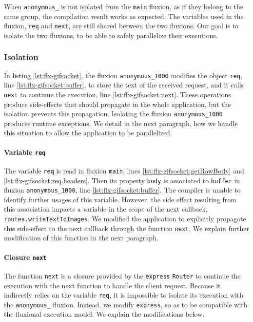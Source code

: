 When \texttt{anonymous\_} is not isolated from the \texttt{main} fluxion, as if they belong to the same group, the compilation result works as expected.
The variables used in the fluxion, \texttt{req} and \texttt{next}, are still shared between the two fluxions.
Our goal is to isolate the two fluxions, to be able to safely parallelize their executions.

\subsubsection{Isolation}

In listing \ref{lst:flx-gifsocket}, the fluxion \texttt{anonymous\_1000} modifies the object \texttt{req}, line \ref{lst:flx-gifsocket:buffer}, to store the text of the received request, and it calls \texttt{next} to continue the execution, line \ref{lst:flx-gifsocket:next}.
These operations produce side-effects that should propagate in the whole application, but the isolation prevents this propagation.
Isolating the fluxion \texttt{anonymous\_1000} produces runtime exceptions.
We detail in the next paragraph, how we handle this situation to allow the application to be parallelized.

\paragraph{Variable \texttt{req}}

The variable \texttt{req} is read in fluxion \texttt{main}, lines \ref{lst:flx-gifsocket:getRawBody} and \ref{lst:flx-gifsocket:req.headers}.
Then its property \texttt{body} is associated to \texttt{buffer} in fluxion \texttt{anonymous\_1000}, line \ref{lst:flx-gifsocket:buffer}.
The compiler is unable to identify further usages of this variable.
However, the side effect resulting from this association impacts a variable in the scope of the next callback, \texttt{routes.writeTextToImages}.
We modified the application to explicitly propagate this side-effect to the next callback through the function \texttt{next}.
We explain further modification of this function in the next paragraph.

\paragraph{Closure \texttt{next}}

The function \texttt{next} is a closure provided by the \texttt{express} \texttt{Router} to continue the execution with the next function to handle the client request.
Because it indirectly relies on the variable \texttt{req}, it is impossible to isolate its execution with the \texttt{anonymous\_} fluxion.
Instead, we modify \texttt{express}, so as to be compatible with the fluxional execution model.
We explain the modifications below.

